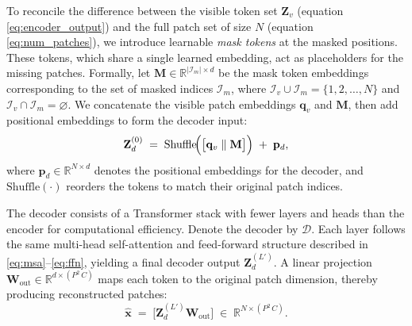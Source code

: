 


To reconcile the difference between the visible token set 
\(\mathbf{Z}_{v}\) (equation \eqref{eq:encoder_output}) and the full 
patch set of size \(N\) (equation \eqref{eq:num_patches}), we introduce 
learnable \emph{mask tokens} at the masked positions. These tokens, 
which share a single learned embedding, act as placeholders for the 
missing patches. Formally, let 
\(\mathbf{M} \in \mathbb{R}^{|\mathcal{I}_m| \times d}\) be the mask token 
embeddings corresponding to the set of masked indices \(\mathcal{I}_m\), 
where \(\mathcal{I}_v \cup \mathcal{I}_m = \{1,2,\dots,N\}\) and 
\(\mathcal{I}_v \cap \mathcal{I}_m = \varnothing\). We concatenate the 
visible patch embeddings \(\mathbf{q}_{v}\) and \(\mathbf{M}\), then add 
positional embeddings to form the decoder input:
\begin{equation}
    \mathbf{Z}_{d}^{(0)}
    \;=\;
    \mathrm{Shuffle}\!\Bigl(\bigl[\mathbf{q}_{v} \;\Vert\; \mathbf{M}\bigr]\Bigr)
    \;+\; 
    \mathbf{p}_{d},
\label{eq:decoder_input}
\end{equation}
where \(\mathbf{p}_{d} \in \mathbb{R}^{N \times d}\) denotes the positional 
embeddings for the decoder, and \(\mathrm{Shuffle}(\cdot)\) reorders the tokens 
to match their original patch indices.

The decoder consists of a Transformer stack with fewer layers and heads 
than the encoder for computational efficiency. Denote the decoder by 
\(\mathcal{D}\). Each layer follows the same multi-head self-attention and 
feed-forward structure described in \eqref{eq:msa}--\eqref{eq:ffn}, yielding 
a final decoder output \(\mathbf{Z}_{d}^{(L')}\). A linear projection 
\(\mathbf{W}_{\mathrm{out}} \in \mathbb{R}^{d \times (P^2\,C)}\) maps each token 
to the original patch dimension, thereby producing reconstructed patches:
\begin{equation}
    \widehat{\mathbf{x}}
    \;=\;
    \bigl[\mathbf{Z}_{d}^{(L')} \mathbf{W}_{\mathrm{out}}\bigr]
    \;\in\;
    \mathbb{R}^{N \times (P^2\,C)}.
\label{eq:decoder_out}
\end{equation}

